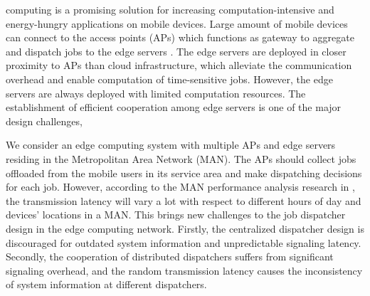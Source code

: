 
 computing is a promising solution for increasing computation-intensive and energy-hungry applications on mobile devices.
Large amount of mobile devices can connect to the access points (APs) which functions as gateway to aggregate and dispatch jobs to the edge servers \cite{MEC-SURVEY}.
The edge servers are deployed in closer proximity to APs than cloud infrastructure, which alleviate the communication overhead and enable computation of time-sensitive jobs.
However, the edge servers are always deployed with limited computation resources.
The establishment of efficient cooperation among edge servers is one of the major design challenges, 

We consider an edge computing system with multiple APs and edge servers residing in the Metropolitan Area Network (MAN).
The APs should collect jobs offloaded from the mobile users in its service area and make dispatching decisions for each job.
However, according to the MAN performance analysis research in \cite{MAN-LATENCY}, the transmission latency will vary a lot with respect to different hours of day and devices' locations in a MAN.
This brings new challenges to the job dispatcher design in the edge computing network.
Firstly, the centralized dispatcher design is discouraged for outdated system information and unpredictable signaling latency.
Secondly, the cooperation of distributed dispatchers suffers from significant signaling overhead, and the random transmission latency causes the inconsistency of system information at different dispatchers.

